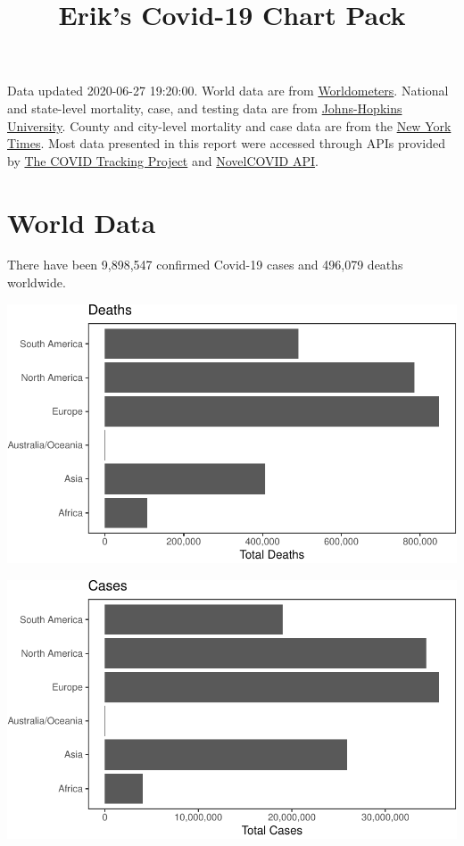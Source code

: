 \documentclass[]{article}
\title{Erik's Covid-19 Chart Pack}
\author{}
\date{}
\begin{document}
\maketitle

Data updated 2020-06-27 19:20:00. World data are from
\href{https://github.com/NovelCovid/API}{Worldometers}. National and
state-level mortality, case, and testing data are from
\href{https://covidtracking.com}{Johns-Hopkins University}. County and
city-level mortality and case data are from the
\href{https://github.com/NovelCovid/API}{New York Times}. Most data
presented in this report were accessed through APIs provided by
\href{https://covidtracking.com}{The COVID Tracking Project} and
\href{https://github.com/NovelCovid/API}{NovelCOVID API}.

\hypertarget{world-data}{%
\section{World Data}\label{world-data}}

There have been 9,898,547 confirmed Covid-19 cases and 496,079 deaths
worldwide.

\includegraphics{covid_files/figure-latex/unnamed-chunk-1-1.pdf}

\includegraphics{covid_files/figure-latex/unnamed-chunk-2-1.pdf}
\end{document}
